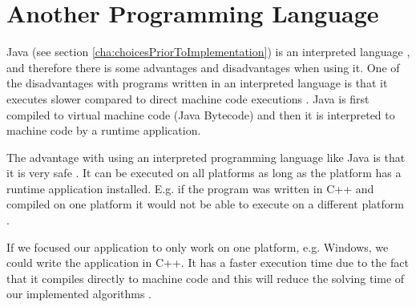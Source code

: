 \section{Another Programming Language}
Java (see section \ref{cha:choicesPriorToImplementation}) is an interpreted language \cite{kilde}, and therefore there is some advantages and disadvantages when using it.
One of the disadvantages with programs written in an interpreted language is that it executes slower compared to direct machine code executions \cite{kilde2}.
Java is first compiled to virtual machine code (Java Bytecode) and then it is interpreted to machine code by a runtime application.

The advantage with using an interpreted programming language like Java is that it is very safe \cite{kilde3}.
It can be executed on all platforms as long as the platform has a runtime application installed. 
E.g. if the program was written in C++ and compiled on one platform it would not be able to execute on a different platform \cite{kilde4}.

If we focused our application to only work on one platform, e.g. Windows, we could write the application in C++.
It has a faster execution time due to the fact that it compiles directly to machine code and this will reduce the solving time of our implemented algorithms \cite{kilde5}. 
